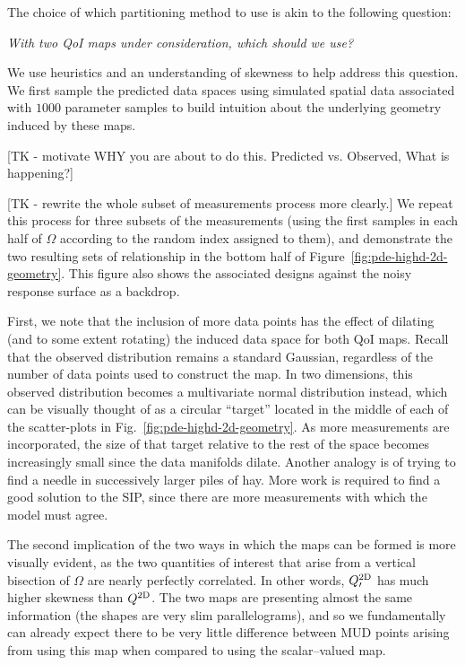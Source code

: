 The choice of which partitioning method to use is akin to the following question:
\begin{center}
\emph{With two QoI maps under consideration, which should we use?}
\end{center}

We use heuristics and an understanding of skewness to help address this question.
We first sample the predicted data spaces using simulated spatial data associated with $1000$ parameter samples to build intuition about the underlying geometry induced by these maps.

[TK - motivate WHY you are about to do this. Predicted vs. Observed, What is happening?]

[TK - rewrite the whole subset of measurements process more clearly.]
We repeat this process for three subsets of the measurements (using the first samples in each half of $\Omega$ according to the random index assigned to them), and demonstrate the two resulting sets of relationship in the bottom half of Figure~\ref{fig:pde-highd-2d-geometry}.
This figure also shows the associated designs against the noisy response surface as a backdrop.

First, we note that the inclusion of more data points has the effect of dilating (and to some extent rotating) the induced data space for both QoI maps.
Recall that the observed distribution remains a standard Gaussian, regardless of the number of data points used to construct the map.
In two dimensions, this observed distribution becomes a multivariate normal distribution instead, which can be visually thought of as a circular ``target'' located in the middle of each of the scatter-plots in Fig.~\ref{fig:pde-highd-2d-geometry}.
As more measurements are incorporated, the size of that target relative to the rest of the space becomes increasingly small since the data manifolds dilate.
Another analogy is of trying to find a needle in successively larger piles of hay.
More work is required to find a good solution to the SIP, since there are more measurements with which the model must agree.

The second implication of the two ways in which the maps can be formed is more visually evident, as the two quantities of interest that arise from a vertical bisection of $\Omega$ are nearly perfectly correlated.
In other words, $Q^\text{2D}_\prime$ has much higher skewness than $Q^\text{2D}$.
The two maps are presenting almost the same information (the shapes are very slim parallelograms), and so we fundamentally can already expect there to be very little difference between MUD points arising from using this map when compared to using the scalar--valued map.

